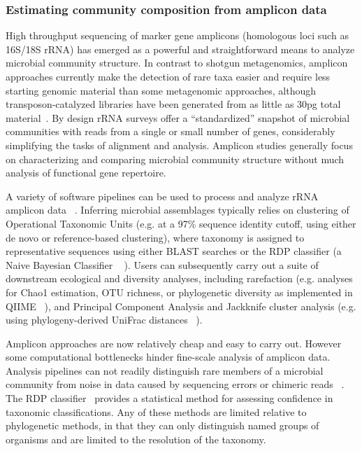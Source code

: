 \documentclass[10pt]{article}
\begin{document}
\subsubsection*{Estimating community composition from amplicon data}
High throughput sequencing of marker gene amplicons (homologous loci such as 16S/18S rRNA) has emerged as a powerful and straightforward means to analyze microbial community structure.
In contrast to shotgun metagenomics, amplicon approaches currently make the detection of rare taxa easier and require less starting genomic material than some metagenomic approaches, although transposon-catalyzed libraries have been generated from as little as 30pg total material~\cite{Adey2010}.
By design rRNA surveys offer a ``standardized'' snapshot of microbial communities with reads from a single or small number of genes, considerably simplifying the tasks of alignment and analysis. 
Amplicon studies generally focus on characterizing and comparing microbial community structure without much analysis of functional gene repertoire. 

A variety of software pipelines can be used to process and analyze rRNA amplicon data ~\cite{Bik2012}. 
Inferring microbial assemblages typically relies on clustering of Operational Taxonomic Units (e.g. at a 97\% sequence identity cutoff, using either de novo or reference-based clustering), where taxonomy is assigned to representative sequences using either BLAST searches or the RDP classifier (a Naive Bayesian Classifier ~\cite{Wang2007} ).
Users can subsequently carry out a suite of downstream ecological and diversity analyses, including rarefaction (e.g. analyses for Chao1 estimation, OTU richness, or phylogenetic diversity as implemented in QIIME ~\cite{Caporaso2010}), and Principal Component Analysis and Jackknife cluster analysis (e.g. using phylogeny-derived UniFrac distances ~\cite{Lozupone2005}).

Amplicon approaches are now relatively cheap and easy to carry out. 
However some computational bottlenecks hinder fine-scale analysis of amplicon data. 
Analysis pipelines can not readily distinguish rare members of a microbial community from noise in data caused by sequencing errors or chimeric reads ~\cite{Bik2012}. 
%
The RDP classifier~\cite{Wang2007} provides a statistical method for assessing confidence in taxonomic classifications.
Any of these methods are limited relative to phylogenetic methods, in that they can only distinguish named groups of organisms and are limited to the resolution of the taxonomy.
      
\end{document}
